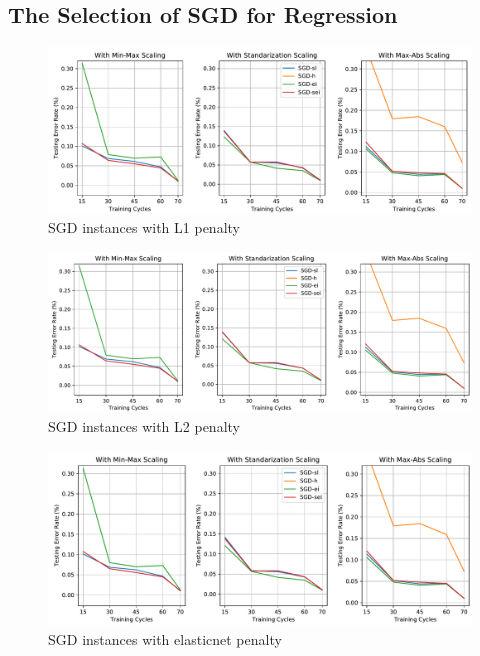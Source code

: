 \documentclass[a4paper,12pt]{article}
\begin{document}
\subsection{The Selection of SGD for Regression} \label{SGDRegressorsTests}
\begin{figure}[H]
	\centering
	\includegraphics[keepaspectratio, width=\linewidth]{graphs/SGDRegressorsWithPenaltyL1.pdf}
	\caption{SGD instances with L1 penalty}
	\label{SGDRL1}
\end{figure}
\begin{figure}[H]
	\centering
	\includegraphics[keepaspectratio, width=\linewidth]{graphs/SGDRegressorsWithPenaltyL2.pdf}
	\caption{SGD instances with L2 penalty}
	\label{SGDRL2}
\end{figure}
\begin{figure}[H]
	\centering
	\includegraphics[keepaspectratio, width=\linewidth]{graphs/SGDRegressorsWithPenaltyElasticnet.pdf}
	\caption{SGD instances with elasticnet penalty}
	\label{SGDRElasticnet}
\end{figure}
\end{document}
